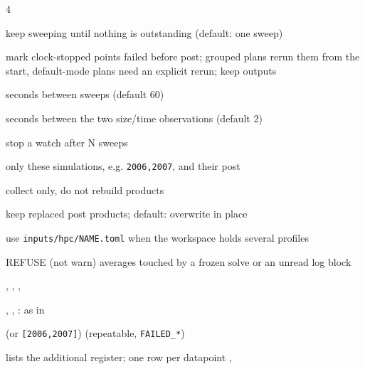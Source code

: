 \begin{multicols}{4}
\begin{flags}
\item {} keep sweeping until nothing is outstanding (default: one sweep)
\item {} mark clock-stopped points failed before post; grouped plans rerun them from the start, default-mode plans need an explicit rerun; keep outputs
\item {} seconds between sweeps (default 60)
\item {} seconds between the two size/time observations (default 2)
\item {} stop a watch after N sweeps
\item {} only these simulations, e.g. \texttt{2006,2007}, and their post
\item {} collect only, do not rebuild products
\item {} keep replaced post products; default: overwrite in place
\item {} use \texttt{inputs/hpc/NAME.toml} when the workspace holds several profiles
\item {} REFUSE (not warn) averages touched by a frozen solve or an unread log block
\item {}, , , 
\item {}, , : as in 
\end{flags}
\begin{flags}
\item {} (or \texttt{[2006,2007]}) \quad {} \quad {} (repeatable, \texttt{FAILED\_*}) \quad {}
\item {} lists the additional register;  one row per datapoint \quad {} \quad {} \quad {}, 
\end{flags}


\end{multicols}
